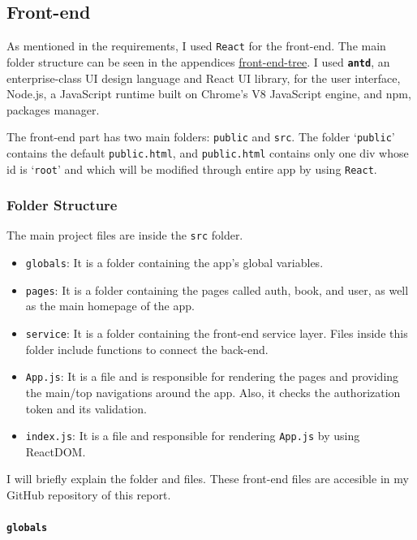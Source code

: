 \subsection{Front-end}

As mentioned in the requirements, I used \texttt{React} for the front-end. The main folder structure can be seen in the appendices \hyperref[front-end-tree]{front-end-tree}. I used \textbf{\texttt{antd}}, an enterprise-class UI design language and React UI library, for the user interface, Node.js, a JavaScript runtime built on Chrome's V8 JavaScript engine, and npm, packages manager.

The front-end part has two main folders: \texttt{public} and \texttt{src}. The folder `\texttt{public}' contains the default \texttt{public.html}, and \texttt{public.html} contains only one div whose id is `\texttt{root}' and which will be modified through entire app by using \texttt{React}.
\newpage

\subsubsection{Folder Structure}

The main project files are inside the \texttt{src} folder.
\begin{itemize}
  \item \texttt{globals}: It is a folder containing the app's global variables.
  \item \texttt{pages}: It is a folder containing the pages called auth, book, and user, as well as the main homepage of the app.
  \item \texttt{service}: It is a folder containing the front-end service layer. Files inside this folder include functions to connect the back-end.
  \item \texttt{App.js}: It is a file and is responsible for rendering the pages and providing the main/top navigations around the app. Also, it checks the authorization token and its validation.
  \item \texttt{index.js}: It is a file and responsible for rendering \texttt{App.js} by using ReactDOM.
\end{itemize}
I will briefly explain the folder and files. These front-end files are accesible in my GitHub repository of this report.

\paragraph{\texttt{globals}}


